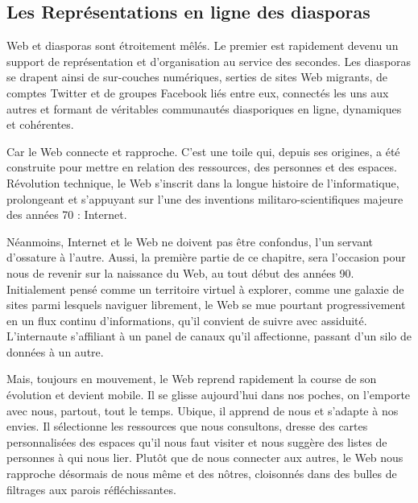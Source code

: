 \documentclass[symmetric,justified,marginals=raggedouter]{tufte-book}
\begin{document}

\cleardoublepage
\begin{minipage}[t,leftmargin=5em]{1.5\linewidth}%
\begin{adjustwidth}{-0.5cm}{}
\chapter{Les Représentations en ligne des diasporas} 
\label{chap:2}
\end{adjustwidth}
\end{minipage}
\hfill

\noindent Web et diasporas sont étroitement mêlés. Le premier est rapidement devenu un support de représentation et d'organisation au service des secondes. Les diasporas se drapent ainsi de sur-couches numériques, serties de sites Web migrants, de comptes Twitter et de groupes Facebook liés entre eux, connectés les uns aux autres et formant de véritables communautés diasporiques en ligne, dynamiques et cohérentes. 

Car le Web connecte et rapproche. C'est une toile qui, depuis ses origines, a été construite pour mettre en relation des ressources, des personnes et des espaces. Révolution technique, le Web s'inscrit dans la longue histoire de l'informatique, prolongeant et s'appuyant sur l'une des inventions militaro-scientifiques majeure des années 70 \citep{hafner_where_1998} : Internet. 

Néanmoins, Internet et le Web ne doivent pas être confondus, l'un servant d'ossature à l'autre. Aussi, la première partie de ce chapitre, sera l'occasion pour nous de revenir sur la naissance du Web, au tout début des années 90. Initialement pensé comme un territoire virtuel à explorer, comme une galaxie de sites parmi lesquels naviguer librement, le Web se mue pourtant progressivement en un flux continu d'informations, qu'il convient de suivre avec assiduité. L'internaute s'affiliant à un panel de canaux qu'il affectionne, passant d'un silo de données à un autre. 

Mais, toujours en mouvement, le Web reprend rapidement la course de son évolution et devient mobile. Il se glisse aujourd'hui dans nos poches, on l'emporte avec nous, partout, tout le temps. Ubique, il apprend de nous et s'adapte à nos envies. Il sélectionne les ressources que nous consultons, dresse des cartes personnalisées des espaces qu'il nous faut visiter et nous suggère des listes de personnes à qui nous lier. Plutôt que de nous connecter aux autres, le Web nous rapproche désormais de nous même et des nôtres, cloisonnés dans des bulles de filtrages aux parois réfléchissantes.
\end{document}
